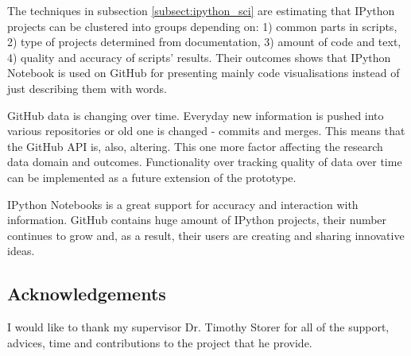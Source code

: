 The techniques in subsection \ref{subsect:ipython_sci} are estimating that IPython projects can be clustered into groups depending on: 1) common parts in scripts, 2) type of projects determined from documentation, 3) amount of code and text, 4) quality and accuracy of scripts' results. Their outcomes shows that IPython Notebook is used on GitHub for presenting mainly code visualisations instead of just describing them with words. 

GitHub data is changing over time. Everyday new information is pushed into various repositories or old one is changed - commits and merges. This means that the GitHub API is, also, altering. This one more factor affecting the research data domain and outcomes. Functionality over tracking quality of data over time can be implemented as a future extension of the prototype.

IPython Notebooks is a great support for accuracy and interaction with information. GitHub contains huge amount of IPython projects, their number continues to grow and, as a result, their users are creating and sharing innovative ideas. 

\subsection*{Acknowledgements} I would like to thank my supervisor Dr. Timothy Storer for all of the support, advices, time and contributions to the project that he provide. 
